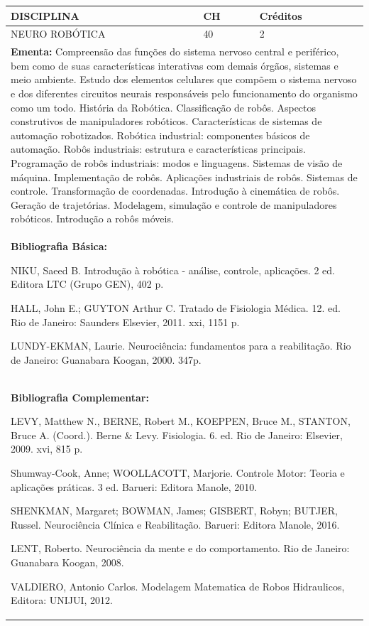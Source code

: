 \documentclass[a4paper, 12pt, openright, oneside, german, french, english, brazil]{abntex2}
\begin{document}
\begin{table}[!h]
  \footnotesize
  \centering
  \begin{tabular}{|p{100mm}|p{10mm}|p{20mm}|}
    \hline
    \textbf{DISCIPLINA} & \textbf{CH} & \textbf{Créditos} \\
    \hline
    NEURO ROBÓTICA & 40 & 2 \\
    \hline
    \multicolumn{3}{|p{130mm}|}{\textbf{Ementa:}  Compreensão das funções do sistema nervoso central e periférico, bem como de suas características interativas com demais órgãos, sistemas e meio ambiente. Estudo dos elementos celulares que compõem o sistema nervoso e dos diferentes circuitos neurais responsáveis pelo funcionamento do organismo como um todo. História da Robótica. Classificação de robôs. Aspectos construtivos de manipuladores robóticos. Características de sistemas de automação robotizados. Robótica industrial: componentes básicos de automação. Robôs industriais: estrutura e características principais. Programação de robôs industriais: modos e linguagens. Sistemas de visão de máquina. Implementação de robôs. Aplicações industriais de robôs. Sistemas de controle. Transformação de coordenadas. Introdução à cinemática de robôs. Geração de trajetórias. Modelagem, simulação e controle de manipuladores robóticos. Introdução a robôs móveis.} \\
    \hline
    \multicolumn{3}{|p{130mm}|}{\textbf{Bibliografia Básica:}

    NIKU, Saeed B. Introdução à robótica - análise, controle, aplicações. 2 ed. Editora LTC (Grupo GEN), 402 p.

HALL, John E.; GUYTON Arthur C. Tratado de Fisiologia Médica. 12. ed. Rio de Janeiro: Saunders Elsevier, 2011. xxi, 1151 p.

LUNDY-EKMAN, Laurie. Neurociência: fundamentos para a reabilitação. Rio de
Janeiro: Guanabara Koogan, 2000. 347p.
} \\
    \hline
    \multicolumn{3}{|p{130mm}|}{\textbf{Bibliografia Complementar:}

    LEVY, Matthew N., BERNE, Robert M., KOEPPEN, Bruce M., STANTON, Bruce A. (Coord.). Berne \& Levy. Fisiologia. 6. ed. Rio de Janeiro: Elsevier, 2009. xvi, 815 p.

Shumway-Cook, Anne; WOOLLACOTT, Marjorie. Controle Motor: Teoria e aplicações
práticas. 3 ed. Barueri: Editora Manole, 2010.

SHENKMAN, Margaret; BOWMAN, James; GISBERT, Robyn; BUTJER, Russel.
Neurociência Clínica e Reabilitação. Barueri: Editora Manole, 2016. 

LENT, Roberto. Neurociência da mente e do comportamento. Rio de Janeiro: Guanabara Koogan, 2008. 

VALDIERO, Antonio Carlos. Modelagem Matematica de Robos Hidraulicos, Editora: UNIJUI, 2012.
} \\
    \hline
  \end{tabular}
\end{table}
\end{document}
